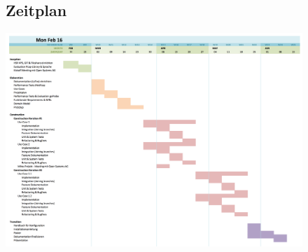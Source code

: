 \clearpage
\begin{figure}
\centering
\subsection{Zeitplan}
\includegraphics[scale=0.45]{mainpart/projektmanagement/img/ganttdiagramm}
\end{figure}
\clearpage

